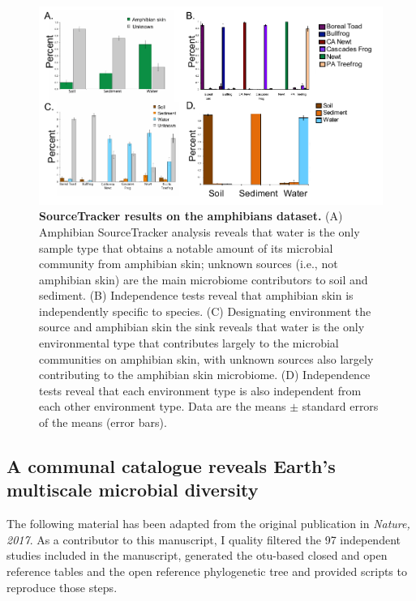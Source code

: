\begin{figure}[htbp]
\includegraphics[width=\columnwidth]{chapter_contributions_figures/AmphibiansST.pdf}
\caption[SourceTracker results on the amphibians dataset]{\textbf{SourceTracker results on the amphibians dataset.}
(A) Amphibian SourceTracker analysis reveals that water is the only sample type
that obtains a notable amount of its microbial community from amphibian skin; unknown sources
(i.e., not amphibian skin) are the main microbiome contributors to soil and sediment.
(B) Independence tests reveal that amphibian skin is independently specific to species.
(C) Designating environment the source and amphibian skin the sink reveals that water
is the only environmental type that contributes largely to the microbial communities
on amphibian skin, with unknown sources also largely contributing to the amphibian
skin microbiome. (D) Independence tests reveal that each environment type is also
independent from each other environment type. Data are the means $\pm$ standard
errors of the means (error bars).}
\label{AmphibianST}
\end{figure}

\subsection{A communal catalogue reveals Earth's multiscale microbial diversity}\label{subsection_emp}

The following material has been adapted from the original publication in
\textsl{Nature, 2017}. As a contributor to this manuscript, I quality filtered the
97 independent studies included in the manuscript, generated the \gls{otu}-based
closed and open reference tables and the open reference phylogenetic tree and provided
scripts to reproduce those steps.

